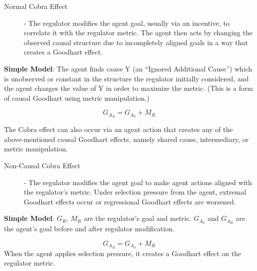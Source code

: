 \documentclass[10pt]{article}
\begin{document}
\begin{description}

\item[Normal Cobra Effect] - The regulator modifies the agent goal, usually via an incentive, to correlate it with the regulator metric. The agent then acts by changing the observed causal structure due to incompletely aligned goals in a way that creates a Goodhart effect.
\end{description}
\textbf{Simple Model}: The agent finds cause Y (an ``Ignored Additional Cause'') which is unobserved or constant in the structure the regulator initially considered, and the agent changes the value of Y in order to maximize the metric. (This is a form of causal Goodhart using metric manipulation.)

\begin{figure}[htb]
\centering
{}
\end{figure}

\begin{equation}  G_{A_R} = G_{A_0} + M_R \end{equation}

The Cobra effect can also occur via an agent action that creates any of the above-mentioned causal Goodhart effects, namely shared cause, intermediary, or metric manipulation.
\begin{description}
\item[Non-Causal Cobra Effect] - The regulator modifies the agent goal to make agent actions aligned with the regulator's metric. Under selection pressure from the agent, extremal Goodhart effects occur or regressional Goodhart effects are worsened.
\end{description}
\textbf{Simple Model}:  $G_R$, $M_R$ are the regulator's goal and metric. $G_{A_0}$ and $G_{A_R}$ are the agent's goal before and after regulator modification.

\begin{equation}  G_{A_R} = G_{A_0} + M_R \end{equation}
When the agent applies selection pressure, it creates a Goodhart effect on the regulator metric.
\end{document}
